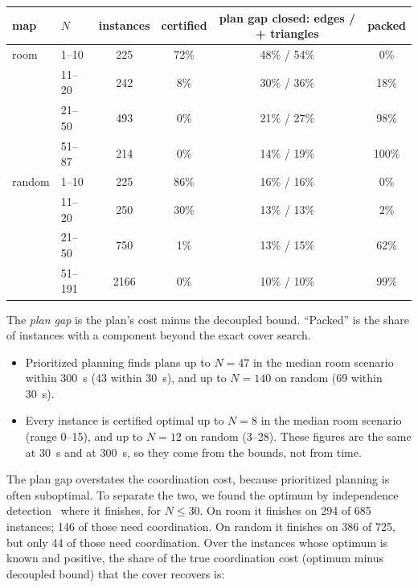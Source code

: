 \documentclass[11pt]{article}
\theoremstyle{definition}
\theoremstyle{remark}
\begin{document}
\begin{center}
\small
\begin{tabular}{llcccc}
\toprule
map & $N$ & instances & certified & plan gap closed: edges / + triangles & packed \\
\midrule
room   & 1--10  & 225 & 72\% & 48\% / 54\% & 0\% \\
       & 11--20 & 242 & 8\%  & 30\% / 36\% & 18\% \\
       & 21--50 & 493 & 0\%  & 21\% / 27\% & 98\% \\
       & 51--87 & 214 & 0\%  & 14\% / 19\% & 100\% \\
\midrule
random & 1--10   & 225  & 86\% & 16\% / 16\% & 0\% \\
       & 11--20  & 250  & 30\% & 13\% / 13\% & 2\% \\
       & 21--50  & 750  & 1\%  & 13\% / 15\% & 62\% \\
       & 51--191 & 2166 & 0\%  & 10\% / 10\% & 99\% \\
\bottomrule
\end{tabular}
\end{center}

\noindent The \emph{plan gap} is the plan's cost minus the decoupled bound.
``Packed'' is the share of instances with a component beyond the exact cover search.
\begin{itemize}[nosep]
\item Prioritized planning finds plans up to $N = 47$ in the median room scenario
  within 300~s (43 within 30~s), and up to $N = 140$ on random (69 within 30~s).
\item Every instance is certified optimal up to $N = 8$ in the median room scenario
  (range 0--15), and up to $N = 12$ on random (3--28). These figures are the same at
  30~s and at 300~s, so they come from the bounds, not from time.
\end{itemize}

The plan gap overstates the coordination cost, because prioritized planning is
often suboptimal. To separate the two, we found the optimum by independence
detection~\cite{standley2010} where it finishes, for $N \le 30$. On room it finishes
on 294 of 685 instances; 146 of those need coordination. On random it finishes on
386 of 725, but only 44 of those need coordination. Over the instances whose
optimum is known and positive, the share of the true coordination cost (optimum minus
decoupled bound) that the cover recovers is:
\end{document}
